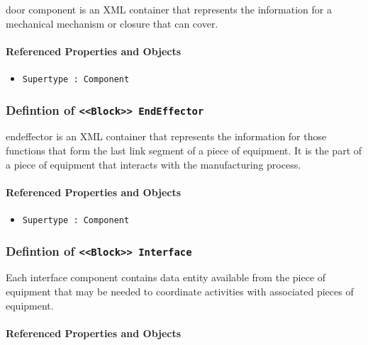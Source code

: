 \FloatBarrier

door component is an XML container that represents the information for a mechanical mechanism or closure that can cover.

\FloatBarrier
\paragraph{Referenced Properties and Objects}

\begin{itemize}
\item \texttt{Supertype : Component}

\end{itemize}
\FloatBarrier
\subsubsection{Defintion of \texttt{<<Block>> EndEffector}}
  \label{type:EndEffector}

\FloatBarrier

endeffector is an XML container that represents the information for those functions that form the last link segment of a piece of equipment. It is the part of a piece of equipment that interacts with the manufacturing process.

\FloatBarrier
\paragraph{Referenced Properties and Objects}

\begin{itemize}
\item \texttt{Supertype : Component}

\end{itemize}
\FloatBarrier
\subsubsection{Defintion of \texttt{<<Block>> Interface}}
  \label{type:Interface}

\FloatBarrier

Each interface component contains data entity available from the piece of equipment that may be needed to coordinate activities with associated pieces of equipment.

\FloatBarrier
\paragraph{Referenced Properties and Objects}


